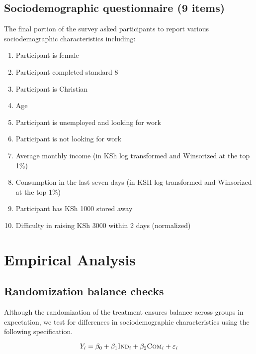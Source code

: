 \documentclass[11pt, a4paper]{article}\usepackage[]{graphicx}\usepackage[]{color}
\begin{document}
    \subsection{Sociodemographic questionnaire (9 items)}

        The final portion of the survey asked participants to report various sociodemographic characteristics including:

        \begin{enumerate}
        \itemsep0em 
            \item Participant is female
            \item Participant completed standard 8
            \item Participant is Christian
            \item Age
            \item Participant is unemployed and looking for work
            \item Participant is not looking for work
            \item Average monthly income (in KSh log transformed and Winsorized at the top 1\%)
            \item Consumption in the last seven days (in KSH log transformed and Winsorized at the top 1\%)
            \item Participant has KSh 1000 stored away 
            \item Difficulty in raising KSh 3000 within 2 days (normalized)
        \end{enumerate}

\section{Empirical Analysis}

    \subsection{Randomization balance checks}

        Although the randomization of the treatment ensures balance across groups in expectation, we test for differences in sociodemographic characteristics using the following specification.

        \begin{equation} \label{eq:balance}
        Y_{i} = \beta_{0} + \beta_{1}\text{\textsc{Ind}}_{i} + \beta_{2}\text{\textsc{Com}}_{i} + \varepsilon_{i}
        \end{equation}
\end{document}
